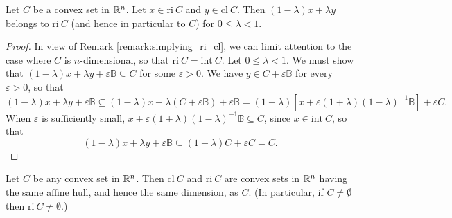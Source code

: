\documentclass[11pt,a4paper]{article}
\begin{document}
\begin{theorem}\label{thm:rel_int_line_seg}
    Let $C$ be a convex set in $\mathbb{R}^n$. Let $x\in \mathrm{ri}\ C$ and $y\in \mathrm{cl}\ C$. Then $(1-\lambda)x+\lambda y$ belongs to $\mathrm{ri}\ C$ (and hence in particular to $C$) for $0\le \lambda <1$.
\end{theorem}

\begin{proof}
    In view of Remark \ref{remark:simplying_ri_cl}, we can limit attention to the case where $C$ is $n$-dimensional, so that $\mathrm{ri}\ C = \mathrm{int}\ C$. Let $0\le \lambda<1$. We must show that $(1-\lambda)x+\lambda y+\varepsilon \mathbb{B}\subseteq C$ for some $\varepsilon>0$. We have $y\in C+\varepsilon\mathbb{B}$ for every $\varepsilon>0$, so that 
    \begin{equation*}
        (1-\lambda)x+\lambda y+\varepsilon \mathbb{B}\subseteq (1-\lambda)x+\lambda (C+\varepsilon\mathbb{B})+\varepsilon \mathbb{B} = (1-\lambda)[x +\varepsilon(1+\lambda)(1-\lambda)^{-1}\mathbb{B}]+\varepsilon C.
    \end{equation*}
    When $\varepsilon$ is sufficiently small, $x +\varepsilon(1+\lambda)(1-\lambda)^{-1}\mathbb{B}\subseteq C$, since $x\in\mathrm{int}\ C$, so that 
    \begin{equation*}
        (1-\lambda)x+\lambda y+\varepsilon \mathbb{B}\subseteq (1-\lambda)C+\varepsilon C = C.
    \end{equation*}
\end{proof}

\begin{theorem}
    Let $C$ be any convex set in $\mathbb{R}^n$. Then $\mathrm{cl}\ C$ and $\mathrm{ri}\ C$ are convex sets in $\mathbb{R}^n$ having the same affine hull, and hence the same dimension, as $C$. (In particular, if $C\neq \emptyset$ then $\mathrm{ri}\ C \neq \emptyset$.)
\end{theorem}
\end{document}
